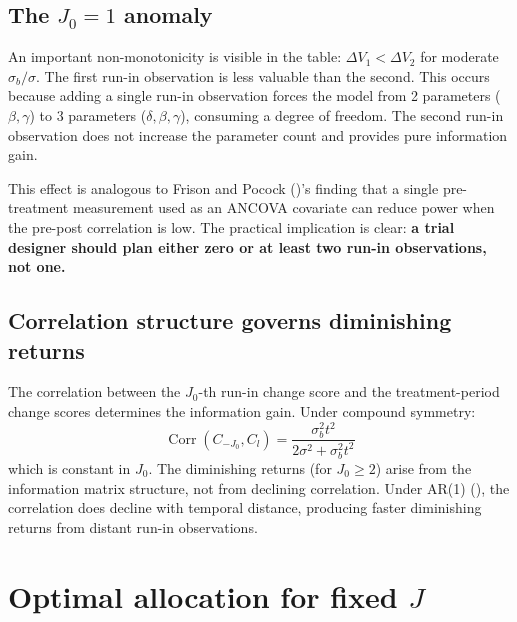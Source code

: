 \documentclass[
  11pt,
]{article}
\begin{document}
\subsection{\texorpdfstring{The \(J_0=1\)
anomaly}{The J\_0=1 anomaly}}\label{the-j_01-anomaly}

An important non-monotonicity is visible in the table:
\(\Delta V_1 < \Delta V_2\) for moderate \(\sigma_b / \sigma\). The
first run-in observation is less valuable than the second. This occurs
because adding a single run-in observation forces the model from 2
parameters (\(\beta, \gamma\)) to 3 parameters
(\(\delta, \beta, \gamma\)), consuming a degree of freedom. The second
run-in observation does not increase the parameter count and provides
pure information gain.

This effect is analogous to Frison and Pocock
()'s finding that a single pre-treatment
measurement used as an ANCOVA covariate can reduce power when the
pre-post correlation is low. The practical implication is clear:
\textbf{a trial designer should plan either zero or at least two run-in
observations, not one.}

\subsection{Correlation structure governs diminishing
returns}\label{correlation-structure-governs-diminishing-returns}

The correlation between the \(J_0\)-th run-in change score and the
treatment-period change scores determines the information gain. Under
compound symmetry: \begin{equation}
  \mathop{\mathrm{Corr}}(C_{-J_0}, C_l) = \frac{\sigma_b^2 t^2}
    {2\sigma^2 + \sigma_b^2 t^2}
\end{equation} which is constant in \(J_0\). The diminishing returns
(for \(J_0 \ge 2\)) arise from the information matrix structure, not
from declining correlation. Under AR(1)
(), the correlation does
decline with temporal distance, producing faster diminishing returns
from distant run-in observations.

\section{\texorpdfstring{Optimal allocation for fixed
\(J\)}{Optimal allocation for fixed J}}\label{optimal-allocation-for-fixed-j}
\end{document}
